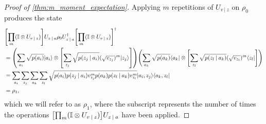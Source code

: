 \documentclass{article}
\DeclarePairedDelimiter{\bra}{\langle}{\rvert} %
\DeclarePairedDelimiter{\ket}{\lvert}{\rangle} %
\DeclarePairedDelimiter{\paren}{\lparen}{\rparen} %
\DeclarePairedDelimiter{\bparen}{[}{]} %
\newcommand{\given}[1][]{\:#1\vert\:}
\begin{document}
\begin{proof}[Proof of \cref{thm:m_moment_expectation}]
Applying $m$ repetitions of $U_{v \given z}$ on $\rho_0$ produces the state
% 
\begin{align}
&\bparen*{\prod_{m} (\mathbb{I} \otimes U_{v \given z})}  U_{z \given a} \rho_0 U_{z \given a}^{\dagger} {\bparen*{\prod_{m} (\mathbb{I} \otimes U_{v \given z})}}^{\dagger}
\\&= \paren*{\sum_{a_i} \sqrt{p(a_i)} \ket{a_i} \otimes \bparen*{\sum_{z_j} \sqrt{p(z_j \given a_i)} (\sqrt{v_{z_j}})^{m} \ket{z_j}}} \paren*{\sum_{a_k} \sqrt{p(a_k)} \bra{a_k} \otimes \bparen*{\sum_{z_l} \sqrt{p(z_l \given a_k)} (\sqrt{v_{z_l}})^{m} \bra{z_l}}}
\\&= \sum_{a_i} \sum_{z_j} \sum_{a_k} \sum_{z_l} \sqrt{p(a_i)
p(z_j \given a_i) v_{z_j}^{m} p(a_k) p(z_l \given a_k) v_{z_l}^{m}} \ket{a_i, z_j} \bra{a_k, z_l}
\\&= \rho_1 \label{eq:rho_1},
\end{align}
% 
which we will refer to as $\rho_1$, where the subscript represents the number of times the operations $ \bparen*{\prod_{m} (\mathbb{I} \otimes U_{v \given z})}  U_{z \given a}$ have been applied.


\end{proof}
\end{document}
